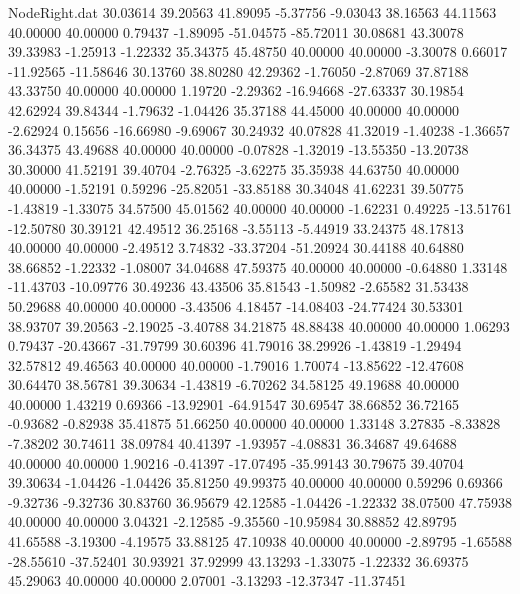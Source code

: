 \begin{filecontents}{NodeRight.dat}
  30.03614   39.20563   41.89095    -5.37756   -9.03043   38.16563   44.11563   40.00000   40.00000    0.79437   -1.89095  -51.04575  -85.72011
  30.08681   43.30078   39.33983    -1.25913   -1.22332   35.34375   45.48750   40.00000   40.00000   -3.30078    0.66017  -11.92565  -11.58646
  30.13760   38.80280   42.29362    -1.76050   -2.87069   37.87188   43.33750   40.00000   40.00000    1.19720   -2.29362  -16.94668  -27.63337
  30.19854   42.62924   39.84344    -1.79632   -1.04426   35.37188   44.45000   40.00000   40.00000   -2.62924    0.15656  -16.66980   -9.69067
  30.24932   40.07828   41.32019    -1.40238   -1.36657   36.34375   43.49688   40.00000   40.00000   -0.07828   -1.32019  -13.55350  -13.20738
  30.30000   41.52191   39.40704    -2.76325   -3.62275   35.35938   44.63750   40.00000   40.00000   -1.52191    0.59296  -25.82051  -33.85188
  30.34048   41.62231   39.50775    -1.43819   -1.33075   34.57500   45.01562   40.00000   40.00000   -1.62231    0.49225  -13.51761  -12.50780
  30.39121   42.49512   36.25168    -3.55113   -5.44919   33.24375   48.17813   40.00000   40.00000   -2.49512    3.74832  -33.37204  -51.20924
  30.44188   40.64880   38.66852    -1.22332   -1.08007   34.04688   47.59375   40.00000   40.00000   -0.64880    1.33148  -11.43703  -10.09776
  30.49236   43.43506   35.81543    -1.50982   -2.65582   31.53438   50.29688   40.00000   40.00000   -3.43506    4.18457  -14.08403  -24.77424
  30.53301   38.93707   39.20563    -2.19025   -3.40788   34.21875   48.88438   40.00000   40.00000    1.06293    0.79437  -20.43667  -31.79799
  30.60396   41.79016   38.29926    -1.43819   -1.29494   32.57812   49.46563   40.00000   40.00000   -1.79016    1.70074  -13.85622  -12.47608
  30.64470   38.56781   39.30634    -1.43819   -6.70262   34.58125   49.19688   40.00000   40.00000    1.43219    0.69366  -13.92901  -64.91547
  30.69547   38.66852   36.72165    -0.93682   -0.82938   35.41875   51.66250   40.00000   40.00000    1.33148    3.27835   -8.33828   -7.38202
  30.74611   38.09784   40.41397    -1.93957   -4.08831   36.34687   49.64688   40.00000   40.00000    1.90216   -0.41397  -17.07495  -35.99143
  30.79675   39.40704   39.30634    -1.04426   -1.04426   35.81250   49.99375   40.00000   40.00000    0.59296    0.69366   -9.32736   -9.32736
  30.83760   36.95679   42.12585    -1.04426   -1.22332   38.07500   47.75938   40.00000   40.00000    3.04321   -2.12585   -9.35560  -10.95984
  30.88852   42.89795   41.65588    -3.19300   -4.19575   33.88125   47.10938   40.00000   40.00000   -2.89795   -1.65588  -28.55610  -37.52401
  30.93921   37.92999   43.13293    -1.33075   -1.22332   36.69375   45.29063   40.00000   40.00000    2.07001   -3.13293  -12.37347  -11.37451

\end{filecontents}
